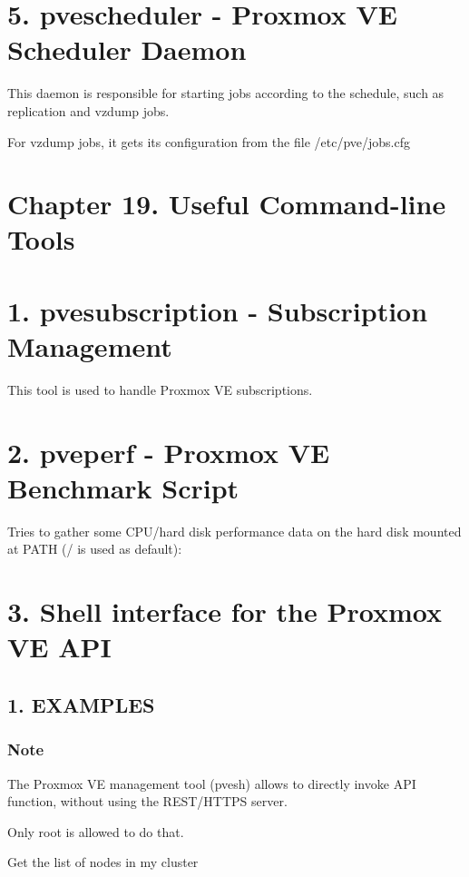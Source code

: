 \section{5. pvescheduler - Proxmox VE Scheduler Daemon}

This daemon is responsible for starting jobs according to the schedule, such as replication and vzdump jobs.

For vzdump jobs, it gets its configuration from the file /etc/pve/jobs.cfg


\section{Chapter 19. Useful Command-line Tools}


\section{1. pvesubscription - Subscription Management}

This tool is used to handle Proxmox VE subscriptions.


\section{2. pveperf - Proxmox VE Benchmark Script}

Tries to gather some CPU/hard disk performance data on the hard disk mounted at PATH (/ is used as default):


\section{3. Shell interface for the Proxmox VE API}

\subsection{1. EXAMPLES}

\subsubsection{Note}

The Proxmox VE management tool (pvesh) allows to directly invoke API function, without using the REST/HTTPS server.

Only root is allowed to do that.

Get the list of nodes in my cluster

